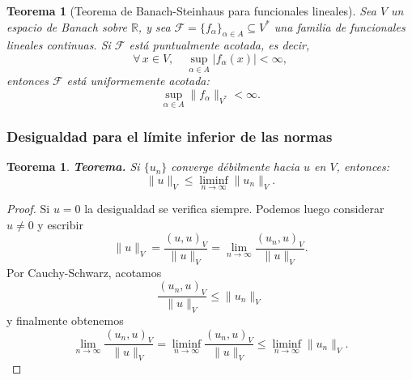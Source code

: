 \documentclass[12pt]{book}
\newtheorem{theorem}{Teorema}
\theoremstyle{definition}
\theoremstyle{plain}
\newtheorem{teorema}{Teorema}[section]
\theoremstyle{remark}
\begin{document}
\begin{teorema}[Teorema de Banach-Steinhaus para funcionales lineales]
Sea \( V \) un espacio de Banach sobre \( \mathbb{R} \), y sea \( \mathcal{F} = \{ f_\alpha \}_{\alpha \in A} \subseteq V^* \) una familia de funcionales lineales continuas.
%
Si \( \mathcal{F} \) está puntualmente acotada, es decir,
\[
\forall \, x \in V, \quad \sup_{\alpha \in A} |f_\alpha(x)| < \infty,
\]
entonces \( \mathcal{F} \) está uniformemente acotada:
\[
\sup_{\alpha \in A} \|f_\alpha\|_{V^*} < \infty.
\]
\end{teorema}

\subsubsection{Desigualdad para el límite inferior de las normas}

\begin{theorem}

\textbf{Teorema.} Si $\{u_n\}$ converge débilmente hacia $u$ en $V$, entonces:
\[
\|u\|_V \leq \liminf_{n \to \infty} \|u_n\|_V.
\]
\end{theorem}

\begin{proof}
Si $u=0$ la desigualdad se verifica siempre. Podemos luego considerar $u\neq 0$
y escribir
\[
\| u \|_V =
\frac{(u,u)_V}{\| u \|_V}
= \lim_{n \to \infty} \frac{(u_n,u)_V}{\| u \|_V}.
\]
Por Cauchy-Schwarz, acotamos
\[
\frac{(u_n,u)_V}{\| u \|_V} \leq \|u_n\|_V
\]
y finalmente obtenemos
\[
\lim_{n \to \infty} \frac{(u_n,u)_V}{\| u \|_V}
=
\liminf_{n \to \infty} \frac{(u_n,u)_V}{\| u \|_V}
\leq 
\liminf_{n \to \infty} \|u_n\|_V.
\]
\end{proof}


\end{document}
